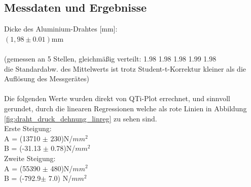 \documentclass[12pt,a4paper]{article}
\begin{document}
\begin{multicols}{2}
\subsection{Messdaten und Ergebnisse}
Dicke des Aluminium-Drahtes [mm]:\\
$(1,98\pm 0.01)$mm\\
\\
(gemessen an 5 Stellen, gleichmäßig verteilt:
1.98
1.98
1.98
1.99
1.98\\
die Standardabw. des Mittelwerts ist trotz Student-t-Korrektur kleiner als die Auflösung des Messgerätes)\\
\\
Die folgenden Werte wurden direkt von QTi-Plot errechnet, und sinnvoll gerundet, durch die linearen Regressionen welche als rote Linien in Abbildung \ref{fig:draht_druck_dehnung_linreg} zu sehen sind.\\
Erste Steigung:\\
A = (13710 $\pm$ 230)N/$mm^2$\\
B = (-31.13 $\pm$ 0.78)N/$mm^2$\\
Zweite Steigung:\\
A = (55390 $\pm$ 480)N/$mm^2$\\
B = (-792.9$\pm$ 7.0) N/$mm^2$\\



\end{multicols}
\end{document}
